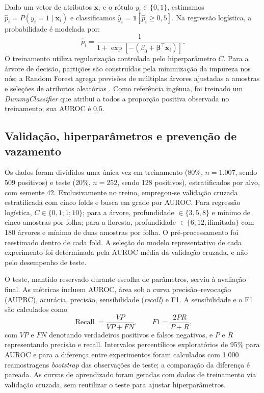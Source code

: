 \documentclass[11pt,a4paper]{article}
\begin{document}
Dado um vetor de atributos $\mathbf{x}_i$ e o rótulo $y_i\in\{0,1\}$, estimamos $\hat p_i=P(y_i=1\mid\mathbf{x}_i)$ e classificamos $\hat y_i=\mathbb{1}[\hat p_i\geq0{,}5]$. Na regressão logística, a probabilidade é modelada por:
\begin{equation}
\hat p_i=\frac{1}{1+\exp\left[-\left(\beta_0+\boldsymbol{\beta}^{\top}\mathbf{x}_i\right)\right]}.
\end{equation}
O treinamento utiliza regularização controlada pelo hiperparâmetro $C$. Para a árvore de decisão, partições são construídas pela minimização da impureza nos nós; a Random Forest agrega previsões de múltiplas árvores ajustadas a amostras e seleções de atributos aleatórias \cite{breiman2001rf}. Como referência ingênua, foi treinado um \textit{DummyClassifier} que atribui a todos a proporção positiva observada no treinamento; sua AUROC é 0,5.

\subsection{Validação, hiperparâmetros e prevenção de vazamento}

Os dados foram divididos uma única vez em treinamento (80\%, $n=1.007$, sendo 509 positivos) e teste (20\%, $n=252$, sendo 128 positivos), estratificados por alvo, com semente 42. Exclusivamente no treino, empregou-se validação cruzada estratificada com cinco folds e busca em grade por AUROC. Para regressão logística, $C\in\{0{,}1;1;10\}$; para a árvore, profundidade $\in\{3,5,8\}$ e mínimo de cinco amostras por folha; para a floresta, profundidade $\in\{6,12,\mathrm{ilimitada}\}$ com 180 árvores e mínimo de duas amostras por folha. O pré-processamento foi reestimado dentro de cada fold. A seleção do modelo representativo de cada experimento foi determinada pela AUROC média da validação cruzada, e não pelo desempenho de teste.

O teste, mantido reservado durante escolha de parâmetros, serviu à avaliação final. As métricas incluem AUROC, área sob a curva precisão--revocação (AUPRC), acurácia, precisão, sensibilidade (\textit{recall}) e F1. A sensibilidade e o F1 são calculados como
\begin{equation}
\operatorname{Recall}=\frac{VP}{VP+FN},\qquad
F1=\frac{2PR}{P+R},
\end{equation}
com $VP$ e $FN$ denotando verdadeiros positivos e falsos negativos, e $P$ e $R$ representando precisão e recall. Intervalos percentílicos exploratórios de 95\% para AUROC e para a diferença entre experimentos foram calculados com 1.000 reamostragens \textit{bootstrap} das observações de teste; a comparação da diferença é pareada. As curvas de aprendizado foram geradas com dados de treinamento via validação cruzada, sem reutilizar o teste para ajustar hiperparâmetros.
\end{document}
